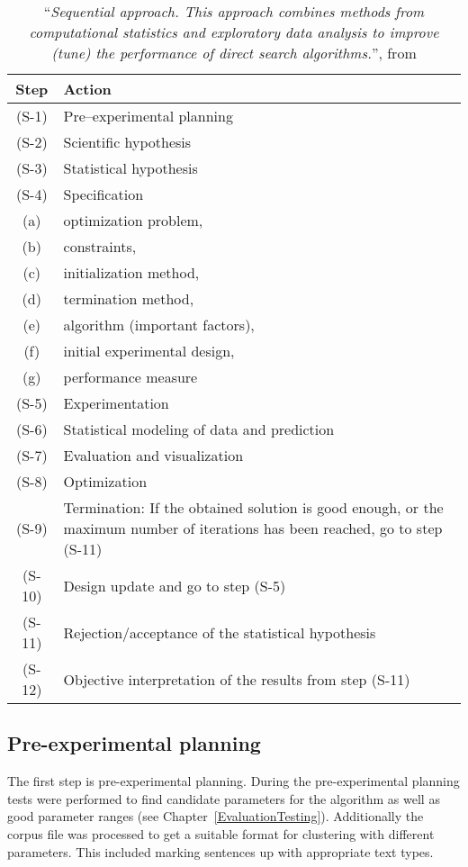 \begin{table}[htdp]
\footnotesize
\begin{center}
\begin{tabular}{|c|p{10cm}|}
\hline
Step & Action\\
\hline
(S-1) & Pre–experimental planning\\
(S-2) & Scientific hypothesis\\
(S-3) & Statistical hypothesis\\
(S-4) & Specification\\
(a) & optimization problem,\\
(b) & constraints,\\
(c) & initialization method,\\
(d) & termination method,\\
(e) & algorithm (important factors),\\ 
(f) & initial experimental design,\\ 
(g) & performance measure\\
(S-5) & Experimentation\\
(S-6) & Statistical modeling of data and prediction\\
(S-7) & Evaluation and visualization\\
(S-8) & Optimization\\
(S-9) & Termination: If the obtained solution is good enough, or the maximum number of iterations has
been reached, go to step (S-11)\\
(S-10) & Design update and go to step (S-5)\\
(S-11) & Rejection/acceptance of the statistical hypothesis\\
(S-12) & Objective interpretation of the results from step (S-11)\\
\hline
\end{tabular}
\caption{``\textit{Sequential approach. This approach combines methods from computational statistics and exploratory data analysis to improve (tune) the performance of direct search algorithms.}'', from \protect \cite[p. 417]{Bartz-Beielstein2004}}
\label{tab:experimentsequence}
\end{center}
\end{table}

\subsection{Pre-experimental planning}
The first step is pre-experimental planning. During the pre-experimental planning tests were performed to find candidate parameters for the algorithm as well as good parameter ranges (see Chapter~\ref{EvaluationTesting}). Additionally the corpus file was processed to get a suitable format for clustering with different parameters. This included marking sentences up with appropriate text types.

